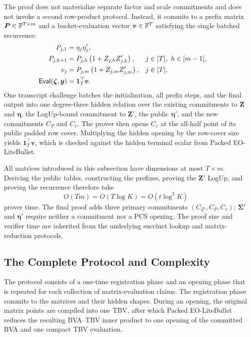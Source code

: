The proof does not materialize separate factor and scale commitments and does
not invoke a second row-product protocol.  Instead, it commits to a prefix
matrix $\bm P\in{\mathbb{F}}^{T\times m}$ and a bucket-evaluation vector
$\bm v\in{\mathbb{F}}^T$ satisfying the single batched recurrence:
\begin{equation}
\label{eq:final-prefix-recurrence}
\begin{aligned}
P_{j,1}
    &=\eta_j\eta'_j,\\
P_{j,h+1}
    &=P_{j,h}\left(1+Z_{j,h}Z'_{j,h}\right),
    &&j\in[T],\ h\in[m-1],\\
v_j
    &=P_{j,m}\left(1+Z_{j,m}Z'_{j,m}\right),
    &&j\in[T],\\
\mathsf{Eval}(\bm\zeta, \bm y)
    &=\bm1_T^\top\bm v.
\end{aligned}
\end{equation}
One transcript challenge batches the initialization, all prefix steps, and
the final output into one degree-three hidden relation over the existing
commitments to $\bm Z$ and $\bm\eta$, the LogUp-bound commitment to
$\bm Z'$, the public $\bm\eta'$, and the new commitments $C_P$ and $C_v$.
The prover then opens $C_v$ at the all-half point of its public padded row
cover.  Multiplying the hidden opening by the row-cover size yields
$\bm1_T^\top\bm v$, which is checked against the hidden terminal scalar from
Packed EO-LiteBullet.

All matrices introduced in this subsection have dimensions at most
$T\times m$.  Deriving the public tables, constructing the prefixes, proving
the $\bm Z'$ LogUp, and proving the recurrence therefore take
\[
    O(Tm)
    =
    O(T\log K)
    =
    O(t\log^3K)
\]
prover time.  The final proof adds three primary commitments
$(C_{Z'},C_P,C_v)$; $\bm\Sigma'$ and $\bm\eta'$ require neither a commitment
nor a PCS opening.  The proof size and verifier time are inherited from the
underlying succinct lookup and matrix-reduction protocols.

\subsection{The Complete Protocol and Complexity}
\label{sec:complete-protocol}

The protocol consists of a one-time registration phase and an opening phase
that is repeated for each collection of matrix-evaluation claims.  The
registration phase commits to the matrices and their hidden shapes.  During
an opening, the original matrix points are compiled into one TBV, after which
Packed EO-LiteBullet reduces the resulting BVA--TBV inner product to one
opening of the committed BVA and one compact TBV evaluation.

